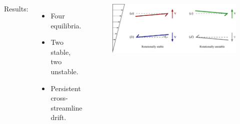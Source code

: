 \documentclass{beamer}
\newcommand{\bi}{\begin{itemize}}
\newcommand{\ei}{\end{itemize}}
\begin{document}
\begin{frame}
\begin{overlayarea}{\textwidth}{\textheight}
\begin{columns}
\begin{figure}[htb]
\begin{center}
			\end{center}
		\end{figure}
		\end{columns}
	 \vspace{0.5cm}
		\begin{columns}
			\small
			Results:
			\bi
			\item Four equilibria.
			\item Two stable, two unstable. 
			\item Persistent cross-streamline drift.
			\ei \vspace{0.5cm}
			\vspace{-1cm}
			\begin{figure}[htb]
				\begin{center}
					\includegraphics[width=1\textwidth]{plots/stone3.png}
				\end{center}
			\end{figure}
		\end{columns}
	\end{overlayarea}
\end{frame}

\end{document}

